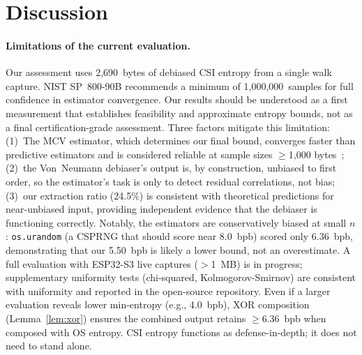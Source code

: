 \section{Discussion}
\label{sec:discussion}

\paragraph{Limitations of the current evaluation.}
Our assessment uses 2,690~bytes of debiased CSI entropy from a single walk capture.
NIST SP~800-90B recommends a minimum of 1,000,000~samples for full confidence in estimator convergence.
Our results should be understood as a first measurement that establishes feasibility and approximate entropy bounds, not as a final certification-grade assessment.
Three factors mitigate this limitation:
(1)~The MCV estimator, which determines our final bound, converges faster than predictive estimators and is considered reliable at sample sizes $\geq$1,000 bytes~\cite{nist2018sp80090b};
(2)~the Von~Neumann debiaser's output is, by construction, unbiased to first order, so the estimator's task is only to detect residual correlations, not bias;
(3)~our extraction ratio (24.5\%) is consistent with theoretical predictions for near-unbiased input, providing independent evidence that the debiaser is functioning correctly.
Notably, the estimators are conservatively biased at small $n$: \texttt{os.urandom} (a CSPRNG that should score near 8.0~bpb) scored only 6.36~bpb, demonstrating that our 5.50~bpb is likely a lower bound, not an overestimate.
A full evaluation with ESP32-S3 live captures ($>$1~MB) is in progress; supplementary uniformity tests (chi-squared, Kolmogorov-Smirnov) are consistent with uniformity and reported in the open-source repository.
Even if a larger evaluation reveals lower min-entropy (e.g., 4.0~bpb), XOR composition (Lemma~\ref{lem:xor}) ensures the combined output retains $\geq$6.36~bpb when composed with OS entropy.
CSI entropy functions as defense-in-depth; it does not need to stand alone.

